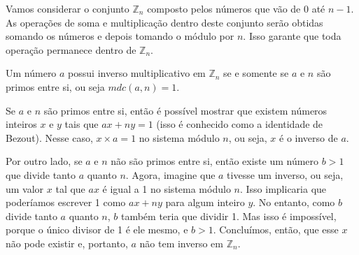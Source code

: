 Vamos considerar o conjunto $\mathbb{Z}_n$ composto pelos números que vão de $0$ até $n-1$.
As operações de soma e multiplicação dentro deste conjunto serão obtidas somando os números e depois tomando o módulo por $n$.
Isso garante que toda operação permanece dentro de $\mathbb{Z}_n$.

\begin{proposition}
\label{prop:inverso}
Um número $a$ possui inverso multiplicativo em $\mathbb{Z}_n$ se e somente se $a$ e $n$ são primos entre si, ou seja $mdc(a,n) = 1$.
\end{proposition}


Se $a$ e $n$ são primos entre si, então é possível mostrar que existem números inteiros $x$ e $y$ tais que $ax + ny = 1$ (isso é conhecido como a identidade de Bezout).
Nesse caso, $x \times a = 1$ no sistema módulo $n$, ou seja, $x$ é o inverso de $a$.

Por outro lado, se $a$ e $n$ não são primos entre si, então existe um número $b > 1$ que divide tanto $a$ quanto $n$.
Agora, imagine que $a$ tivesse um inverso, ou seja, um valor $x$ tal que $ax$ é igual a 1 no sistema módulo $n$.
Isso implicaria que poderíamos escrever 1 como $ax + ny$ para algum inteiro $y$.
No entanto, como $b$ divide tanto $a$ quanto $n$, $b$ também teria que dividir 1.
Mas isso é impossível, porque o único divisor de 1 é ele mesmo, e $b > 1$. Concluímos, então, que esse $x$ não pode existir e, portanto, $a$ não tem inverso em $\mathbb{Z}_n$.

